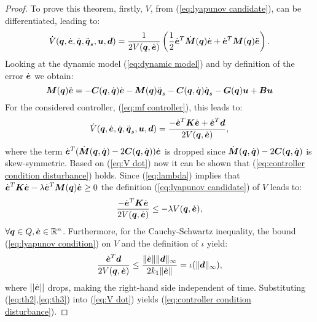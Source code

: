 \begin{proof}
    To prove this theorem, firstly,  $V$, from (\ref{eq:lyapunov candidate}), can be differentiated, leading to:
    \begin{equation}
        \dot{V}({\boldsymbol{q}},\dot{\boldsymbol{e}},\dot{{\boldsymbol{q}}},\ddot{{\boldsymbol{q}}}_s,\boldsymbol{u},\boldsymbol{d}) = \frac{1}{2 V({\boldsymbol{q}},\dot{\boldsymbol{e}})} \left( \frac{1}{2}\dot{\boldsymbol{e}}^T \dot{\boldsymbol{M}}({\boldsymbol{q}}) \dot{\boldsymbol{e}}+\dot{\boldsymbol{e}}^T \boldsymbol{M}({\boldsymbol{q}}) \ddot{\boldsymbol{e}} \right).
    \end{equation}
    Looking at the dynamic model (\ref{eq:dynamic model}) and by definition of the error $\dot{\boldsymbol{e}}$ we obtain:
    \begin{equation}
     \boldsymbol{M}({\boldsymbol{q}})\ddot{\boldsymbol{e}}=-\boldsymbol{C}({\boldsymbol{q}},\dot{{\boldsymbol{q}}})\dot{\boldsymbol{e}}-\boldsymbol{M}({\boldsymbol{q}})\ddot{{\boldsymbol{q}}}_s-\boldsymbol{C}({\boldsymbol{q}},\dot{{\boldsymbol{q}}})\dot{{\boldsymbol{q}}}_s-\boldsymbol{G}({\boldsymbol{q}})\boldsymbol{u}+\boldsymbol{B}\boldsymbol{u}     
    \end{equation}
    For the considered controller, (\ref{eq:mf controller}), this leads to:
    \begin{equation} \label{eq:V dot}
        \dot{V}({\boldsymbol{q}},\dot{\boldsymbol{e}},\dot{{\boldsymbol{q}}},\ddot{{\boldsymbol{q}}}_s,\boldsymbol{u},\boldsymbol{d}) = \frac{-\dot{\boldsymbol{e}}^T \boldsymbol{K} \dot{\boldsymbol{e}} + \dot{\boldsymbol{e}}^T \boldsymbol{d}}{2 V({\boldsymbol{q}},\dot{\boldsymbol{e}})},
    \end{equation}
    where the term $\dot{\boldsymbol{e}}^T(\dot{\boldsymbol{M}}({\boldsymbol{q}},\dot{{\boldsymbol{q}}})-2\boldsymbol{C}({\boldsymbol{q}},\dot{{\boldsymbol{q}}}))\dot{\boldsymbol{e}}$ is dropped since $\dot{\boldsymbol{M}}({\boldsymbol{q}},\dot{{\boldsymbol{q}}})-2\boldsymbol{C}({\boldsymbol{q}},\dot{{\boldsymbol{q}}})$ is \\skew-symmetric. Based on (\ref{eq:V dot}) now it can be shown that (\ref{eq:controller condition disturbance}) holds. Since (\ref{eq:lambda}) implies that $\dot{\boldsymbol{e}}^T \boldsymbol{K}\dot{\boldsymbol{e}}-\lambda \dot{\boldsymbol{e}}^T \boldsymbol{M}({\boldsymbol{q}}) \dot{\boldsymbol{e}} \geq 0$ the definition (\ref{eq:lyapunov candidate}) of $V$ leads to:
    \begin{equation} \label{eq:th2}
        \frac{-\dot{\boldsymbol{e}}^T \boldsymbol{K}\dot{\boldsymbol{e}}}{2V({\boldsymbol{q}},\dot{\boldsymbol{e}})}\leq -\lambda V({\boldsymbol{q}},\dot{\boldsymbol{e}}),  
    \end{equation}
    $\forall {\boldsymbol{q}} \in Q, \dot{\boldsymbol{e}} \in \mathbb{R}^n$. Furthermore, for the Cauchy-Schwartz inequality, the bound (\ref{eq:lyapunov condition}) on $V$ and the definition of $\iota$ yield:
    \begin{equation} \label{eq:th3}
        \frac{\dot{\boldsymbol{e}}^T\boldsymbol{d}}{2V({\boldsymbol{q}},\dot{\boldsymbol{e}})}\leq \frac{\lVert \dot{\boldsymbol{e}}\rVert \lVert \boldsymbol{d} \rVert _\infty}{2k_1\lVert \dot{\boldsymbol{e}} \rVert}=\iota(\lVert \boldsymbol{d} \rVert _\infty),
    \end{equation}
    where $||\dot{\boldsymbol{e}}||$ drops, making the right-hand side independent of time. Substituting (\ref{eq:th2},\ref{eq:th3}) into (\ref{eq:V dot}) yields (\ref{eq:controller condition disturbance}).
\end{proof}
